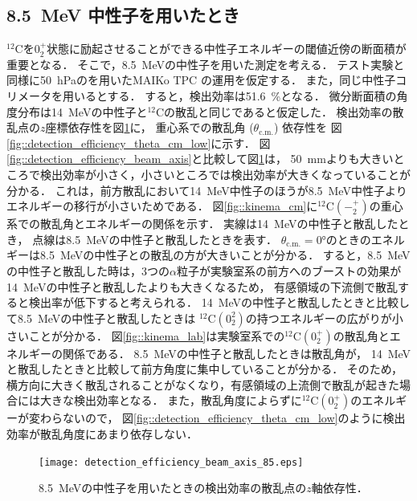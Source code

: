 \documentclass[../master]{subfiles}
\begin{document}
\subsection{8.5~MeV 中性子を用いたとき}
${}^{12}\mathrm{C}$を$0_2^+$状態に励起させることができる中性子エネルギーの閾値近傍の断面積が重要となる．
そこで，\SI{8.5}{\mega\electronvolt}の中性子を用いた測定を考える．
テスト実験と同様に\SI{50}{\hecto\pascal}の\isoButaneHydro を用いたMAIKo TPC の運用を仮定する．
また，同じ中性子コリメータを用いるとする．
すると，検出効率は\SI{51.6}{\percent}となる．
微分断面積の角度分布は\SI{14}{\mega\electronvolt}の中性子と${}^{12}\mathrm{C}$の散乱と同じであると仮定した．
検出効率の散乱点の$z$座標依存性を図\ref{fig::detection_efficiency_beam_axis_low}に，
重心系での散乱角 ($\theta_{\text{c.m.}}$) 依存性を
図\ref{fig::detection_efficiency_theta_cm_low}に示す．
図\ref{fig::detection_efficiency_beam_axis}と比較して図\ref{fig::detection_efficiency_beam_axis_low}は，
\SI{50}{\milli\metre}よりも大きいところで検出効率が小さく，小さいところでは検出効率が大きくなっていることが分かる．
これは，前方散乱において\SI{14}{\mega\electronvolt}中性子のほうが\SI{8.5}{\mega\electronvolt}中性子より
エネルギーの移行が小さいためである．
図\ref{fig::kinema_cm}に${}^{12}\mathrm{C}(-_2^+)$の重心系での散乱角とエネルギーの関係を示す．
実線は\SI{14}{\mega\electronvolt}の中性子と散乱したとき，
点線は\SI{8.5}{\mega\electronvolt}の中性子と散乱したときを表す．
$\theta_{\text{c.m.}} = $\ang{0}のときのエネルギーは\SI{8.5}{\mega\electronvolt}の中性子との散乱の方が大きいことが分かる．
すると，\SI{8.5}{\mega\electronvolt}の中性子と散乱した時は，3つの$\alpha$粒子が実験室系の前方へのブーストの効果が
\SI{14}{\mega\electronvolt}の中性子と散乱したよりも大きくなるため，
有感領域の下流側で散乱すると検出率が低下すると考えられる．
\SI{14}{\mega\electronvolt}の中性子と散乱したときと比較して\SI{8.5}{\mega\electronvolt}の中性子と散乱したときは
${}^{12}\mathrm{C}(0_2^2)$の持つエネルギーの広がりが小さいことが分かる．
図\ref{fig::kinema_lab}は実験室系での${}^{12}\mathrm{C}(0_2^+)$の散乱角とエネルギーの関係である．
\SI{8.5}{\mega\electronvolt}の中性子と散乱したときは散乱角が，
\SI{14}{\mega\electronvolt}と散乱したときと比較して前方角度に集中していることが分かる．
そのため，横方向に大きく散乱されることがなくなり，有感領域の上流側で散乱が起きた場合には大きな検出効率となる．
また，散乱角度によらずに${}^{12}\mathrm{C}(0_2^+)$のエネルギーが変わらないので，
図\ref{fig::detection_efficiency_theta_cm_low}のように検出効率が散乱角度にあまり依存しない．
\begin{figure}
  \centering
  \texttt{[image: detection\_efficiency\_beam\_axis\_85.eps]}
  \caption{\SI{8.5}{\mega\electronvolt}の中性子を用いたときの検出効率の散乱点の$z$軸依存性．}
  \label{fig::detection_efficiency_beam_axis_low}
\end{figure}
\end{document}
